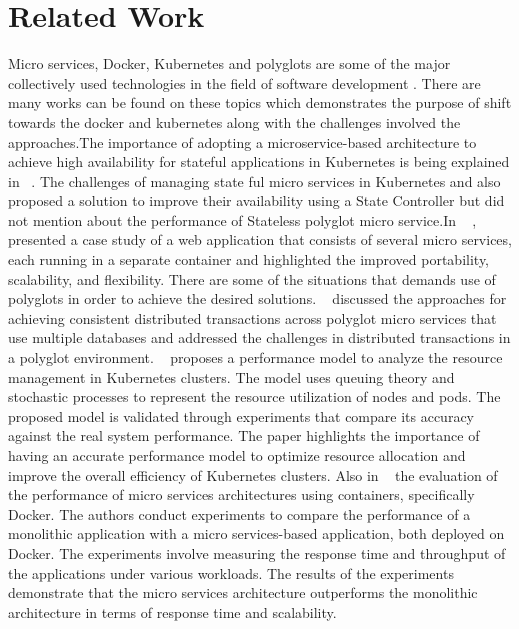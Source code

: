 \section{Related Work}
Micro services, Docker, Kubernetes and polyglots are some of the major collectively used technologies in the field of software development . There are many works can be found on these topics which demonstrates the purpose of shift towards the docker and kubernetes along with the challenges involved the approaches.The importance of adopting a microservice-based architecture to achieve high availability for stateful applications in Kubernetes is being explained in    ~\cite{vayghan2019microservice}. The challenges of managing state ful micro services in Kubernetes and also proposed a solution to improve their availability using a State Controller but did not mention about the performance of Stateless polyglot micro service.In ~\cite{sharma2020docker} , presented a case study of a web application that consists of several micro services, each running in a separate container and highlighted the  improved portability, scalability, and flexibility. There are some of the situations that demands use of polyglots in order to achieve the desired solutions. ~\cite{zhang2019grit} discussed the approaches for achieving consistent distributed transactions across polyglot micro services that use multiple databases and addressed the challenges in distributed transactions in a polyglot environment. ~\cite{medel2016modelling} proposes a performance model to analyze the resource management in Kubernetes clusters. The model uses queuing theory and stochastic processes to represent the resource utilization of nodes and pods. The proposed model is validated through experiments that compare its accuracy against the real system performance. The paper highlights the importance of having an accurate performance model to optimize resource allocation and improve the overall efficiency of Kubernetes clusters. Also in ~\cite{amaral2015performance} the evaluation of the performance of micro services architectures using containers, specifically Docker. The authors conduct experiments to compare the performance of a monolithic application with a micro services-based application, both deployed on Docker. The experiments involve measuring the response time and throughput of the applications under various workloads. The results of the experiments demonstrate that the micro services architecture outperforms the monolithic architecture in terms of response time and scalability.


